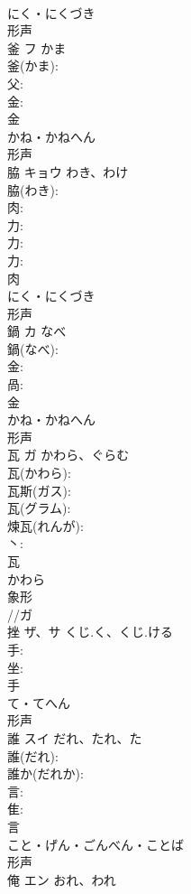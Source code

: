 \documentclass[8pt]{extreport}
\begin{document}
\begin{CJK}{UTF8}{min}
\\	にく・にくづき	
\\	形声 
\\	釜	フ	かま		
\\	釜(かま): 
\\	父: 
\\	金: 
\\	金	
\\	かね・かねへん	
\\	形声 
\\	脇	キョウ	わき、わけ		
\\	脇(わき): 
\\	肉: 
\\	力: 
\\	力: 
\\	力: 
\\	肉	
\\	にく・にくづき	
\\	形声 
\\	鍋	カ	なべ		
\\	鍋(なべ): 
\\	金: 
\\	咼: 
\\	金	
\\	かね・かねへん	
\\	形声 
\\	瓦	ガ	かわら、ぐらむ		
\\	瓦(かわら): 
\\	瓦斯(ガス): 
\\	瓦(グラム): 
\\	煉瓦(れんが): 
\\	丶: 
\\	瓦	
\\	かわら	
\\	象形 
\\	//ガ 
\\	挫	ザ、サ	くじ.く、くじ.ける		
\\	手: 
\\	坐: 
\\	手	
\\	て・てへん	
\\	形声 
\\	誰	スイ	だれ、たれ、た		
\\	誰(だれ): 
\\	誰か(だれか): 
\\	言: 
\\	隹: 
\\	言	
\\	こと・げん・ごんべん・ことば	
\\	形声 
\\	俺	エン	おれ、われ		

\end{CJK}
\end{document}
